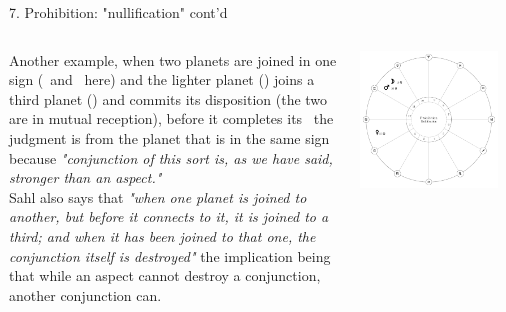 \begin{frame}[t]{7. Prohibition: "nullification" cont'd}
\begin{columns}[T, onlytextwidth]
Another example, when two planets are joined in one sign (\Moon\ and \Mars\ here) and the lighter planet (\Moon) joins a third planet (\Venus) and commits its disposition (the two are in mutual reception), before it completes its \Conjunction\, the judgment is from the planet that is in the same sign because \textsl{"conjunction of this sort is, as we have said, stronger than an aspect."} \\

\vspace{0.25cm}
Sahl also says that \textsl{"when one planet is joined to another, but before it connects to it, it is joined to a third; and when it has been joined to that one, the conjunction itself is destroyed"} the implication being that while an aspect cannot destroy a conjunction, another conjunction can.

\begin{center}
{\includegraphics[width=0.9\textwidth]{charts/64a-nullification}} \\
\end{center}
\end{columns}
\end{frame}
